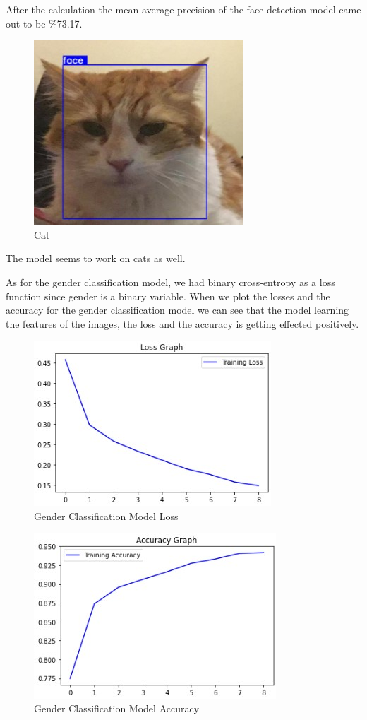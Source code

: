 \documentclass[conference]{IEEEtran}
\begin{document}
After the calculation the mean average precision of the face detection model came out to be \%73.17.

\begin{figure}[htbp]
\centering
\includegraphics[scale=0.75]{cat.jpg}
\caption{Cat}
\label{fig:Cat}
\end{figure}

\bigskip

The model seems to work on cats as well.

\bigskip

As for the gender classification model, we had binary cross-entropy as a loss function since gender is a binary variable. When we plot the losses and the accuracy for the gender classification model we can see that the model learning the features of the images, the loss and the accuracy is getting effected positively.

\begin{figure}[htbp]
\centering
\includegraphics[scale=0.75]{gender_loss.jpg}
\caption{Gender Classification Model Loss}
\label{fig:genderloss}
\end{figure}

\begin{figure}[htbp]
\centering
\includegraphics[scale=0.75]{gender_accuracy.jpg}
\caption{Gender Classification Model Accuracy}
\label{fig:genderaccuracy}
\end{figure}
\end{document}
